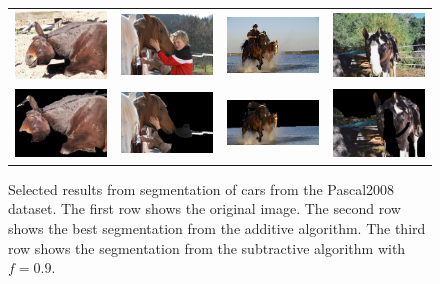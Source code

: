 \documentclass[10pt,twocolumn,letterpaper]{article}
\begin{document}
\begin{figure}[p]
\centering
\begin{tabular}{ p{3cm} p{3cm} p{3cm} p{3cm} }
\includegraphics[width=2.95cm]{figures/add_res/horse/2008_001542.jpg.eps} &
\includegraphics[width=2.95cm]{figures/add_res/horse/2008_001992.jpg.eps} &
\includegraphics[width=2.95cm]{figures/add_res/horse/2008_002172.jpg.eps} &
\includegraphics[width=2.95cm]{figures/add_res/horse/2008_002509.jpg.eps} \\
\includegraphics[width=2.95cm]{figures/add_res/horse/2008_001542.jpg_3_good.jpg.eps} &
\includegraphics[width=2.95cm]{figures/add_res/horse/2008_001992.jpg_3_good.jpg.eps} &
\includegraphics[width=2.95cm]{figures/add_res/horse/2008_002172.jpg_3_good.jpg.eps} &
\includegraphics[width=2.95cm]{figures/add_res/horse/2008_002509.jpg_3_good.jpg.eps} \\
\end{tabular}
\caption{Selected results from segmentation of cars from the Pascal2008
dataset.  The first row shows the original image.  The second row shows
the best segmentation from the additive algorithm.  The third row shows
the segmentation from the subtractive algorithm with $f=0.9$.}
\label{fig:horse_good_results}
\end{figure}
\end{document}

